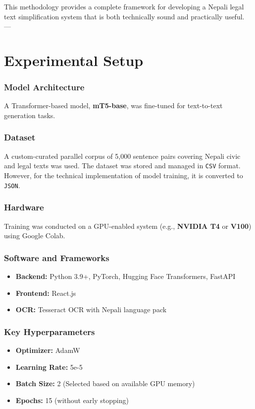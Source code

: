 \documentclass[12pt]{report}
\begin{document}
This methodology provides a complete framework for developing a Nepali legal text simplification system that is both technically sound and practically useful.
---

\chapter{ Experimental Setup}


\subsection*{Model Architecture}
A Transformer-based model, \textbf{mT5-base}, was fine-tuned for text-to-text generation tasks.

\subsection*{Dataset}
A custom-curated parallel corpus of 5,000 sentence pairs covering Nepali civic and legal texts was used. The dataset was stored and managed in \texttt{CSV} format. However, for the technical implementation of model training, it is converted to \texttt{JSON}.

\subsection*{Hardware}
Training was conducted on a GPU-enabled system (e.g., \textbf{NVIDIA T4} or \textbf{V100}) using Google Colab.

\subsection*{Software and Frameworks}
\begin{itemize}
    \item \textbf{Backend:} Python 3.9+, PyTorch, Hugging Face Transformers, FastAPI
    \item \textbf{Frontend:} React.js
    \item \textbf{OCR:} Tesseract OCR with Nepali language pack
\end{itemize}

\subsection*{Key Hyperparameters}
\begin{itemize}
    \item \textbf{Optimizer:} AdamW
    \item \textbf{Learning Rate:} 5e-5
    \item \textbf{Batch Size:} 2  (Selected based on available GPU memory)
    \item \textbf{Epochs:} 15 (without early stopping)
\end{itemize}
\end{document}
